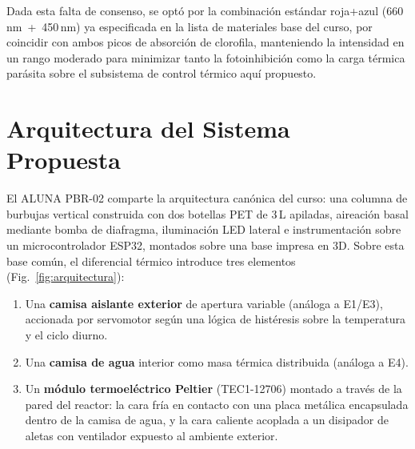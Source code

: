 \documentclass[conference]{IEEEtran}
\begin{document}
Dada esta falta de consenso, se opt\'o por la combinaci\'on est\'andar
roja+azul (660\,nm~+~450\,nm) ya especificada en la lista de materiales
base del curso, por coincidir con ambos picos de absorci\'on de clorofila,
manteniendo la intensidad en un rango moderado para minimizar tanto la
fotoinhibici\'on como la carga t\'ermica par\'asita sobre el subsistema de
control t\'ermico aqu\'i propuesto.

\section{Arquitectura del Sistema Propuesta}

El ALUNA PBR-02 comparte la arquitectura can\'onica del curso: una columna
de burbujas vertical construida con dos botellas PET de 3\,L apiladas,
aireaci\'on basal mediante bomba de diafragma, iluminaci\'on LED lateral e
instrumentaci\'on sobre un microcontrolador ESP32, montados sobre una base
impresa en 3D. Sobre esta base com\'un, el diferencial t\'ermico introduce
tres elementos (Fig.~\ref{fig:arquitectura}):

\begin{enumerate}
\item Una \textbf{camisa aislante exterior} de apertura variable
(an\'aloga a E1/E3), accionada por servomotor seg\'un una l\'ogica de
hist\'eresis sobre la temperatura y el ciclo diurno.
\item Una \textbf{camisa de agua} interior como masa t\'ermica distribuida
(an\'aloga a E4).
\item Un \textbf{m\'odulo termoel\'ectrico Peltier} (TEC1-12706) montado a
trav\'es de la pared del reactor: la cara fr\'ia en contacto con una placa
met\'alica encapsulada dentro de la camisa de agua, y la cara caliente
acoplada a un disipador de aletas con ventilador expuesto al ambiente
exterior.
\end{enumerate}
\end{document}
